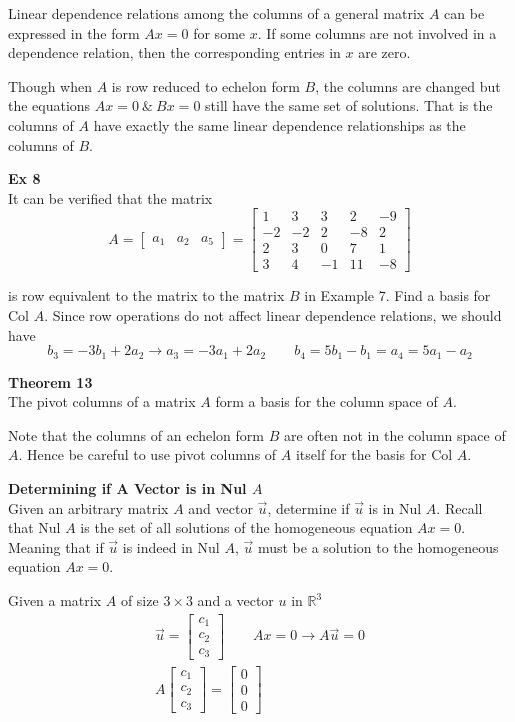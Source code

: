 \documentclass{article}
\begin{document}
  Linear dependence relations among the columns of a general matrix $ A $ can be expressed in the form $ Ax=0 $ for some $ x $. If some columns are not involved in a dependence relation, then the corresponding entries in $ x $ are zero. 

  Though when $ A $ is row reduced to echelon form $ B $, the columns are changed but the equations $ Ax=0 ~\&~ Bx=0 $ still have the same set of solutions. That is the columns of $ A $ have exactly the same linear dependence relationships as the columns of $ B $.

  \textbf{Ex 8}\\
  It can be verified that the matrix
  \[
    A=\begin{bmatrix}
      a_1 &a_2 &a_5
    \end{bmatrix} = 
    \begin{bmatrix}
      1 &3 &3 &2 &-9\\
      -2 &-2 &2 &-8 &2\\
      2 &3 &0 &7 &1\\
      3 &4 &-1 &11 &-8
    \end{bmatrix}
  \]

  is row equivalent to the matrix to the matrix $ B $ in Example 7. Find a basis for Col $ A $. Since row operations do not affect linear dependence relations, we should have
  \[
    b_3 =-3b_1 + 2a_2 \to a_3 = -3a_1 + 2a_2 \qquad b_4 =5b_1-b_1=a_4=5a_1-a_2
  \]

  \textbf{Theorem 13}\\
  The pivot columns of a matrix $ A $ form a basis for the column space of $ A $. 

  Note that the columns of an echelon form $ B $ are often not in the column space of $ A $. Hence be careful to use pivot columns of $ A $ itself for the basis for Col $ A $.

  \textbf{Determining if A Vector is in Nul $ A $ }\\
  Given an arbitrary matrix $ A $ and vector $ \vec{u} $, determine if $ \vec{u} $ is in Nul $ A $. Recall that Nul $ A $ is the set of all solutions of the homogeneous equation $ Ax=0 $. Meaning that if $ \vec{u} $ is indeed in Nul $ A $, $ \vec{u} $ must be a solution to the homogeneous equation $ Ax=0 $.

  Given a matrix $ A $ of size $ 3 \times 3 $ and a vector $ u $ in $ \mathbb{R}^{3}  $      
  \[
    \begin{gathered}
      \vec{u} = \begin{bmatrix}
        c_1\\
        c_2\\
        c_3
      \end{bmatrix} \qquad
    Ax=0 \to A \vec{u} = 0\\
    A \begin{bmatrix}
      c_1\\
      c_2\\
      c_3
    \end{bmatrix} = \begin{bmatrix}
      0\\
      0\\
      0
    \end{bmatrix}
    \end{gathered}
  \]
\end{document}
